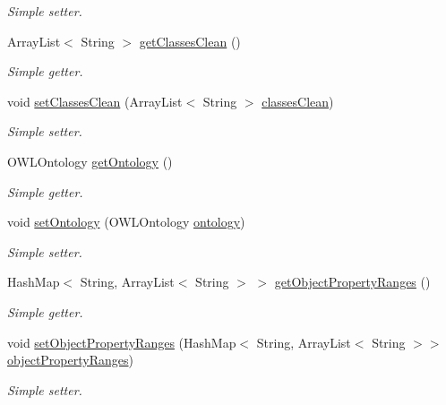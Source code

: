 \begin{DoxyCompactItemize}
\begin{DoxyCompactList}\small\item\em Simple setter. \end{DoxyCompactList}\item 
ArrayList$<$ String $>$ \hyperlink{class_ontology_1_1_object_property_a32263c437748315c900e2c5226d00323}{getClassesClean} ()
\begin{DoxyCompactList}\small\item\em Simple getter. \end{DoxyCompactList}\item 
void \hyperlink{class_ontology_1_1_object_property_a69db404679dc64a382ab8cbcb495f1d1}{setClassesClean} (ArrayList$<$ String $>$ \hyperlink{class_ontology_1_1_object_property_aa8e9d767788209520016911f53bb0f58}{classesClean})
\begin{DoxyCompactList}\small\item\em Simple setter. \end{DoxyCompactList}\item 
OWLOntology \hyperlink{class_ontology_1_1_object_property_a10e0f7c4bb0d6143e73ad04d9af4b812}{getOntology} ()
\begin{DoxyCompactList}\small\item\em Simple getter. \end{DoxyCompactList}\item 
void \hyperlink{class_ontology_1_1_object_property_ab2d33c749bee1769bed4e8f17600ecaa}{setOntology} (OWLOntology \hyperlink{class_ontology_1_1_object_property_a29d4ef0f8ba3a809b35cc36b6863f122}{ontology})
\begin{DoxyCompactList}\small\item\em Simple setter. \end{DoxyCompactList}\item 
HashMap$<$ String, ArrayList$<$ String $>$ $>$ \hyperlink{class_ontology_1_1_object_property_a837c1581c09bfb4d570299c4efd18274}{getObjectPropertyRanges} ()
\begin{DoxyCompactList}\small\item\em Simple getter. \end{DoxyCompactList}\item 
void \hyperlink{class_ontology_1_1_object_property_a12b5bd5f4c3b4f5c7e1351dfe22f9943}{setObjectPropertyRanges} (HashMap$<$ String, ArrayList$<$ String $>$$>$ \hyperlink{class_ontology_1_1_object_property_a7e8b47c59b8d708d2ab5a02058a795f1}{objectPropertyRanges})
\begin{DoxyCompactList}\small\item\em Simple setter. \end{DoxyCompactList}\item 
$$
\end{DoxyCompactItemize}
